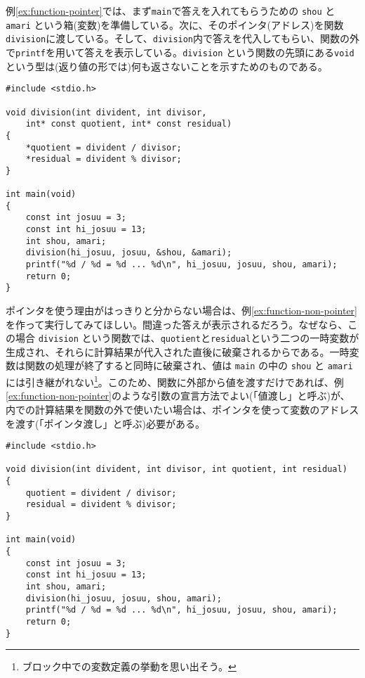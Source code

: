 例\ref{ex:function-pointer}では、まず\texttt{main}で答えを入れてもらうための \texttt{shou} と \texttt{amari} という箱(変数)を準備している。次に、そのポインタ(アドレス)を関数\texttt{division}に渡している。そして、\texttt{division}内で答えを代入してもらい、関数の外で\texttt{printf}を用いて答えを表示している。\texttt{division} という関数の先頭にある\texttt{void}という型は(返り値の形では)何も返さないことを示すためのものである。
\begin{reidai}\label{ex:function-pointer}
    \begin{verbatim}
#include <stdio.h>

void division(int divident, int divisor,
    int* const quotient, int* const residual)
{
    *quotient = divident / divisor;
    *residual = divident % divisor;
}

int main(void)
{
    const int josuu = 3;
    const int hi_josuu = 13;
    int shou, amari;
    division(hi_josuu, josuu, &shou, &amari);
    printf("%d / %d = %d ... %d\n", hi_josuu, josuu, shou, amari);
    return 0;
}
\end{verbatim}
\end{reidai} \noindent
ポインタを使う理由がはっきりと分からない場合は、例\ref{ex:function-non-pointer}を作って実行してみてほしい。間違った答えが表示されるだろう。なぜなら、この場合 \texttt{division} という関数では、\texttt{quotient}と\texttt{residual}という二つの一時変数が生成され、それらに計算結果が代入された直後に破棄されるからである。一時変数は関数の処理が終了すると同時に破棄され、値は \texttt{main} の中の \texttt{shou} と \texttt{amari} には引き継がれない\footnote{ブロック中での変数定義の挙動を思い出そう。}。このため、関数に外部から値を渡すだけであれば、例\ref{ex:function-non-pointer}のような引数の宣言方法でよい(「値渡し」と呼ぶ)が、内での計算結果を関数の外で使いたい場合は、ポインタを使って変数のアドレスを渡す(「ポインタ渡し」と呼ぶ)必要がある。
\begin{reidai}\label{ex:function-non-pointer}
    \begin{verbatim}
#include <stdio.h>

void division(int divident, int divisor, int quotient, int residual)
{
    quotient = divident / divisor;
    residual = divident % divisor;
}

int main(void)
{
    const int josuu = 3;
    const int hi_josuu = 13;
    int shou, amari;
    division(hi_josuu, josuu, shou, amari);
    printf("%d / %d = %d ... %d\n", hi_josuu, josuu, shou, amari);
    return 0;
}
\end{verbatim}
\end{reidai}

